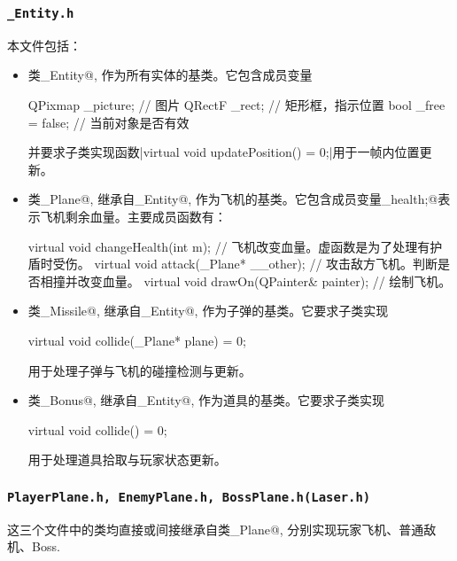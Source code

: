 \documentclass[UTF8,12pt]{ctexart}
\begin{document}
	        \subsubsection{\tt \_Entity.h}
	            本文件包括：
	            \begin{itemize}[nosep]
	                \item 类\cppinline@_Entity@, 作为所有实体的基类。它包含成员变量
	                    \begin{cppcode}
                            QPixmap _picture; // 图片
                            QRectF _rect; // 矩形框，指示位置
                            bool _free = false; // 当前对象是否有效
                        \end{cppcode}
	                    并要求子类实现函数\cppinline|virtual void updatePosition() = 0;|用于一帧内位置更新。
	                \item 类\cppinline@_Plane@, 继承自\cppinline@_Entity@, 作为飞机的基类。它包含成员变量\cppinline@int _health;@表示飞机剩余血量。主要成员函数有：
	                    \begin{cppcode}
                            virtual void changeHealth(int m); // 飞机改变血量。虚函数是为了处理有护盾时受伤。
                            virtual void attack(_Plane* __other); // 攻击敌方飞机。判断是否相撞并改变血量。
                            virtual void drawOn(QPainter& painter); // 绘制飞机。
                        \end{cppcode}
	                \item 类\cppinline@_Missile@, 继承自\cppinline@_Entity@, 作为子弹的基类。它要求子类实现
	                    \begin{cppcode}
                            virtual void collide(_Plane* plane) = 0;
                        \end{cppcode}
	                    用于处理子弹与飞机的碰撞检测与更新。
	                \item 类\cppinline@_Bonus@, 继承自\cppinline@_Entity@, 作为道具的基类。它要求子类实现
	                    \begin{cppcode}
                            virtual void collide() = 0;
                        \end{cppcode}
	                    用于处理道具拾取与玩家状态更新。
	            \end{itemize}

	        \subsubsection{\tt PlayerPlane.h, EnemyPlane.h, BossPlane.h(Laser.h)}
	            这三个文件中的类均直接或间接继承自类\cppinline@_Plane@, 分别实现玩家飞机、普通敌机、Boss.
\end{document}
